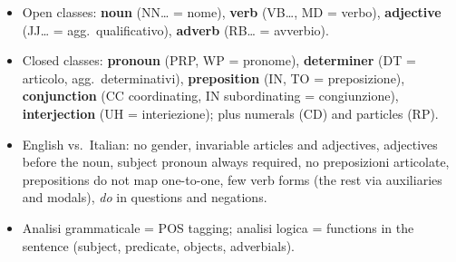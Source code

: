 \begin{nbsummary}
\begin{itemize}[nosep]
  \item Open classes: \textbf{noun} (NN\ldots{} = nome), \textbf{verb} (VB\ldots, MD = verbo),
        \textbf{adjective} (JJ\ldots{} = agg.\ qualificativo), \textbf{adverb} (RB\ldots{} =
        avverbio).
  \item Closed classes: \textbf{pronoun} (PRP, WP = pronome), \textbf{determiner} (DT =
        articolo, agg.\ determinativi), \textbf{preposition} (IN, TO = preposizione),
        \textbf{conjunction} (CC coordinating, IN subordinating = congiunzione),
        \textbf{interjection} (UH = interiezione); plus numerals (CD) and particles (RP).
  \item English vs.\ Italian: no gender, invariable articles and adjectives, adjectives
        before the noun, subject pronoun always required, no preposizioni articolate,
        prepositions do not map one-to-one, few verb forms (the rest via auxiliaries and
        modals), \emph{do} in questions and negations.
  \item Analisi grammaticale = POS tagging; analisi logica = functions in the sentence
        (subject, predicate, objects, adverbials).
\end{itemize}
\end{nbsummary}

